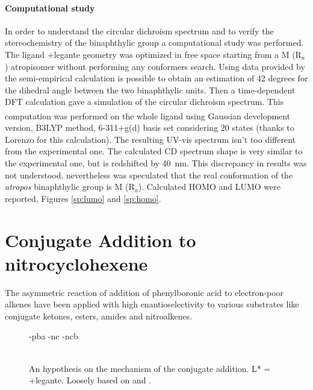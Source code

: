   \paragraph{Computational study}
    In order to understand the circular dichroism spectrum and to verify the stereo\-chemistry of the bi\-naphthylic group a computational study was performed. The ligand \cmpd+{legante} geometry was optimized in free space starting from a M (R$_a$) atrop\-isomer without performing any conformers search. Using data provided by the semi-empirical calculation is possible to obtain an estimation of 42 degrees for the dihedral angle between the two bi\-naphthylic units. Then a time-dependent DFT calculation gave a simulation of the circular dichroism spectrum. 
    This computation was performed on the whole ligand using Gaussian\textsuperscript{\textregistered} development version, B3LYP method, 6-311+g(d) basis set considering 20 states (thanks to Lorenzo for this calculation). The resulting UV-vis spectrum isn't too different from the experimental one. The calculated CD spectrum shape is very similar to the experimental one, but is redshifted by 40~nm. This discrepancy in results was not understood, nevertheless was speculated that the real conformation of the \emph{atropos} bi\-naphthylic group is M (R$_a$). Calculated HOMO and LUMO were reported, Figures \ref{sp:lumo} and \ref{sp:homo}.



\section{Conjugate Addition to nitro\-cyclohexene}
  The asymmetric reaction of addition of phenyl\-boronic acid to electron-poor alkenes have been applied with high enantio\-selectivity to various substrates like conjugate ketones, esters, amides and nitro\-alkenes.
  \begin{figure}
    \cmpdref-{pba}
    \cmpdref-{nc}
    \cmpdref-{ncb}
    \caption{\\ An hypothesis on the mechanism of the conjugate addition. L* = \cmpd+{legante}. Loosely based on \cite{Hayashi2000} and \cite{Hayashi2002}.\label{sc:meccanismo}}
  \end{figure}

